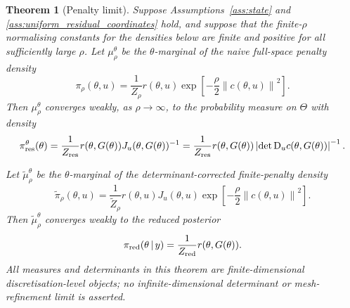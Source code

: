 \documentclass[11pt]{article}
\newtheorem{theorem}{Theorem}
\newcommand{\D}{\mathrm{D}}
\newcommand{\abs}[1]{\left\lvert #1\right\rvert}
\newcommand{\norm}[1]{\left\lVert #1\right\rVert}
\newcommand{\given}{\,|\,}
\begin{document}
\begin{theorem}[Penalty limit]
\label{thm:penalty_limit}
Suppose Assumptions~\ref{ass:state} and \ref{ass:uniform_residual_coordinates} hold, and suppose that the finite-\(\rho\) normalising constants for the densities below are finite and positive for all sufficiently large \(\rho\). Let \(\mu_\rho^\theta\) be the \(\theta\)-marginal of the naive full-space penalty density
\begin{equation}
 \pi_\rho(\theta,u)
 =
 \frac{1}{Z_\rho}
 r(\theta,u)
 \exp\!\left[-\frac{\rho}{2}\norm{c(\theta,u)}^2\right].
 \label{eq:pi_rho_revised}
\end{equation}
Then \(\mu_\rho^\theta\) converges weakly, as \(\rho\to\infty\), to the probability measure on \(\Theta\) with density
\begin{equation}
 \pi^\theta_{\rm res}(\theta)
 =
 \frac{1}{Z_{\rm res}}
 r(\theta,G(\theta))
 J_u(\theta,G(\theta))^{-1}
 =
 \frac{1}{Z_{\rm res}}
 r(\theta,G(\theta))
 \abs{\det\D_u c(\theta,G(\theta))}^{-1}.
 \label{eq:res_limit_density}
\end{equation}

Let \(\widetilde\mu_\rho^\theta\) be the \(\theta\)-marginal of the determinant-corrected finite-penalty density
\begin{equation}
 \widetilde{\pi}_\rho(\theta,u)
 =
 \frac{1}{\widetilde Z_\rho}
 r(\theta,u)
 J_u(\theta,u)
 \exp\!\left[-\frac{\rho}{2}\norm{c(\theta,u)}^2\right].
 \label{eq:corrected_pi_rho}
\end{equation}
Then \(\widetilde\mu_\rho^\theta\) converges weakly to the reduced posterior
\begin{equation}
 \pi_{\rm red}(\theta\given y)
 =
 \frac{1}{Z_{\rm red}}r(\theta,G(\theta)).
 \label{eq:corrected_limit_density_revised}
\end{equation}
All measures and determinants in this theorem are finite-dimensional discretisation-level objects; no infinite-dimensional determinant or mesh-refinement limit is asserted.
\end{theorem}
\end{document}
